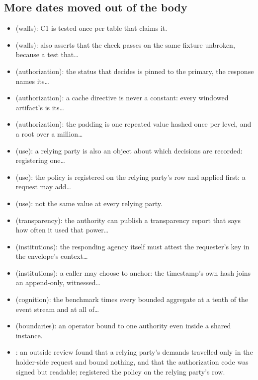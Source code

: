 \subsection*{More dates moved out of the body}

\begin{itemize}
  \item {} (walls): C1 is tested once per table that claims it.
  \item {} (walls): also asserts that the check passes on the same fixture unbroken, because a test that\ldots
  \item {} (authorization): the status that decides  is pinned to the primary, the response names its\ldots
  \item {} (authorization): a cache directive is never a constant: every windowed artifact's  is its\ldots
  \item {} (authorization): the padding is one repeated value hashed once per level, and a root over a million\ldots
  \item {} (use): a relying party is also an object about which decisions are recorded: registering one\ldots
  \item {} (use): the policy is registered on the relying party's row and applied first: a request may add\ldots
  \item {} (use): not the same value at every relying party.
  \item {} (transparency): the authority can publish a transparency report that says how often it used that power\ldots
  \item {} (institutions): the responding agency itself must attest the requester's key in the envelope's context\ldots
  \item {} (institutions): a caller may choose to anchor: the timestamp's own hash joins an append-only, witnessed\ldots
  \item {} (cognition): the benchmark times every bounded aggregate at a tenth of the event stream and at all of\ldots
  \item {} (boundaries): an operator bound to one authority even inside a shared instance.
  \item {}: an outside review found that a relying party's demands travelled only in the
    holder-side request and bound nothing, and that the authorization code was signed but readable;
     registered the policy on the relying party's row.

\end{itemize}
